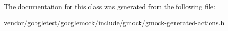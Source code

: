 The documentation for this class was generated from the following file\+:\begin{DoxyCompactItemize}
\item 
vendor/googletest/googlemock/include/gmock/gmock-\/generated-\/actions.\+h\end{DoxyCompactItemize}
